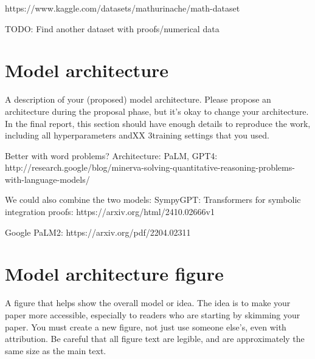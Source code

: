 \documentclass{article}
\begin{document}
https://www.kaggle.com/datasets/mathurinache/math-dataset

TODO: Find another dataset with proofs/numerical data


\section{Model architecture}

A description of your (proposed) model architecture.
Please propose an architecture during the proposal
phase, but it's okay to change your architecture. In the
final report, this section should have enough details to
reproduce the work, including all hyperparameters andXX
3training settings that you used.

Better with word problems?
Architecture: PaLM, GPT4: http://research.google/blog/minerva-solving-quantitative-reasoning-problems-with-language-models/

We could also combine the two models:
SympyGPT: Transformers for symbolic integration proofs: https://arxiv.org/html/2410.02666v1

Google PaLM2: https://arxiv.org/pdf/2204.02311

\section{Model architecture figure}

A figure that helps show the overall model or idea. The
idea is to make your paper more accessible, especially
to readers who are starting by skimming your paper.
You must create a new figure, not just use someone
else's, even with attribution. Be careful that all figure
text are legible, and are approximately the same size
as the main text.




\end{document}
